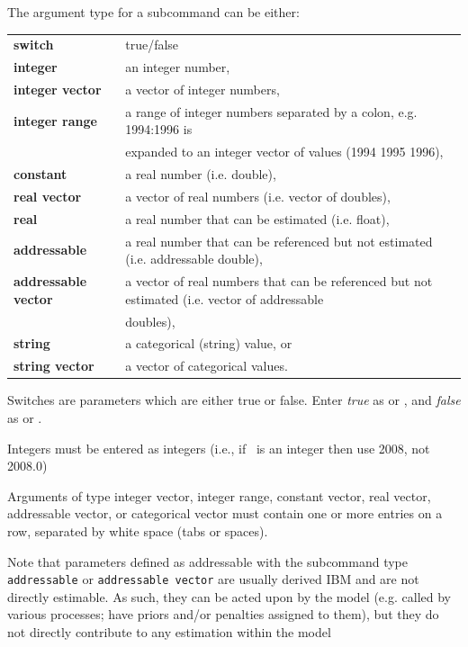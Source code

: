 The argument type for a subcommand can be either:

\begin{tabular}{ll}
\textbf{switch} & true/false\\ 
\textbf{integer}& an integer number,\\
\textbf{integer vector} & a vector of integer numbers,\\
\textbf{integer range} & a range of integer numbers separated by a colon, e.g. 1994:1996 is \\ & expanded to an integer vector of values (1994 1995 1996),\\
\textbf{constant} & a real number (i.e. double),\\
\textbf{real vector} & a vector of real numbers (i.e. vector of doubles),\\
\textbf{real} & a real number that can be estimated (i.e. float),\\
\textbf{addressable} & a real number that can be referenced but not estimated (i.e. addressable double),\\
\textbf{addressable vector} & a vector of real numbers that can be referenced but not estimated (i.e. vector of addressable \\ & doubles),\\
\textbf{string} & a categorical (string) value, or\\
\textbf{string vector} & a vector of categorical values.
\end{tabular}

Switches are parameters which are either true or false. Enter \emph{true} as  or , and \emph{false} as  or . 

Integers must be entered as integers (i.e., if \ is an integer then use 2008, not 2008.0)

Arguments of type integer vector, integer range, constant vector, real vector, addressable vector, or categorical vector must contain one or more entries on a row, separated by white space (tabs or spaces). 

Note that parameters defined as addressable with the subcommand type \texttt{addressable} or \texttt{addressable vector} are usually derived IBM and are not directly estimable. As such, they can be acted upon by the model (e.g. called by various processes; have priors and/or penalties assigned to them), but they do not directly contribute to any estimation within the model

